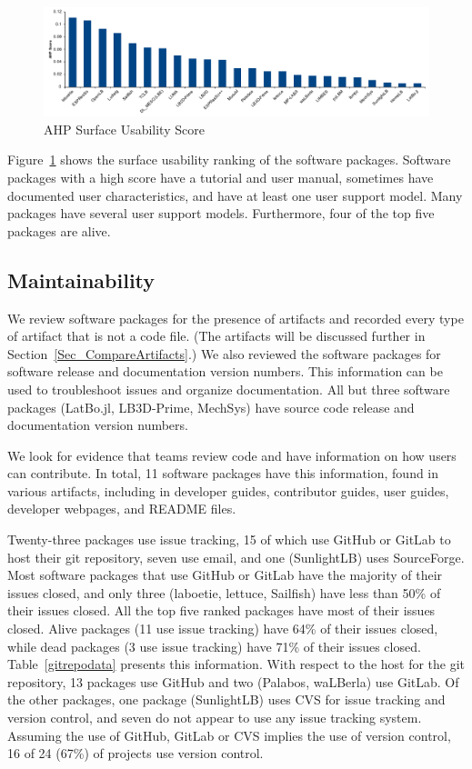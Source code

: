 \documentclass[final, 3p, times, authoryear]{elsarticle}
\begin{document}
\begin{figure}[h!]
	\begin{center}
		\includegraphics[width=1.0\textwidth]{./figures/usability_chart.pdf}
		\caption{AHP Surface Usability Score}
		\label{Fig_Usability}
	\end{center}
\end{figure}

Figure~\ref{Fig_Usability} shows the surface usability ranking of the software
packages. Software packages with a high score have a tutorial and user manual,
sometimes have documented user characteristics, and have at least one user
support model. Many packages have several user support models. Furthermore, four
of the top five packages are alive. 

\subsection{Maintainability} \label{Sec_Maintainability}

We review software packages for the presence of artifacts and recorded every
type of artifact that is not a code file. (The artifacts will be discussed
further in Section~\ref{Sec_CompareArtifacts}.)  We also reviewed the software
packages for software release and documentation version numbers. This
information can be used to troubleshoot issues and organize documentation. All
but three software packages (LatBo.jl, LB3D-Prime, MechSys) have source code
release and documentation version numbers.

We look for evidence that teams review code and have information on how users
can contribute. In total, 11 software packages have this information, found in
various artifacts, including in developer guides, contributor guides, user
guides, developer webpages, and README files. 

Twenty-three packages use issue tracking, 15 of which use GitHub or GitLab to
host their git repository, seven use email, and one (SunlightLB) uses
SourceForge. Most software packages that use GitHub or GitLab have the majority
of their issues closed, and only three (laboetie, lettuce, Sailfish) have less
than 50\% of their issues closed. All the top five ranked packages have most of
their issues closed. Alive packages (11 use issue tracking) have 64\% of their
issues closed, while dead packages (3 use issue tracking) have 71\% of their
issues closed. Table~\ref{gitrepodata} presents this information. With respect
to the host for the git repository, 13 packages use GitHub and two (Palabos,
waLBerla) use GitLab. Of the other packages, one package (SunlightLB) uses CVS
for issue tracking and version control, and seven do not appear to use any issue
tracking system.  Assuming the use of GitHub, GitLab or CVS implies the use of
version control, 16 of 24 (67\%) of projects use version control.
\end{document}
